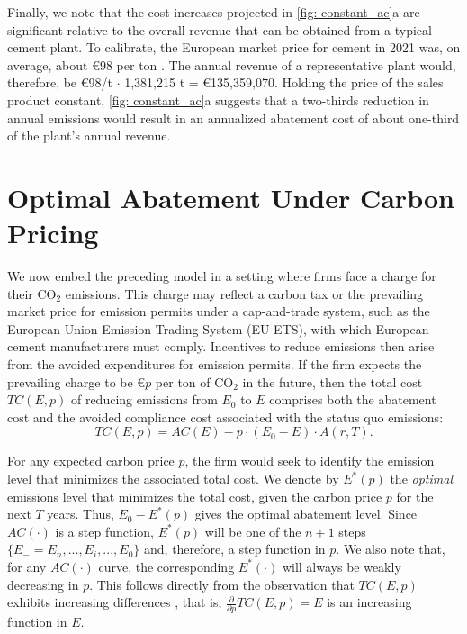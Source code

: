 \documentclass[12pt, a4paper]{article} %
\begin{document}
Finally, we note that the cost increases projected in \autoref{fig: constant_ac}a are significant relative to the overall revenue that can be obtained from a typical cement plant. To calibrate, the European market price for cement in 2021 was, on average, about \euro 98 per ton \citep{bnp2021heavy}. The annual revenue of a representative plant would, therefore, be \euro 98/t $\cdot$ 1,381,215 t = \euro 135,359,070. Holding the price of the sales product constant, \autoref{fig: constant_ac}a suggests that a two-thirds reduction in annual emissions would result in an annualized abatement cost of about one-third of the plant's annual revenue.


\section{Optimal Abatement Under Carbon Pricing}
\label{sec: results}

We now embed the preceding model in a setting where firms face a charge for their CO$_2$ emissions. This charge may reflect a carbon tax or the prevailing market price for emission permits under a cap-and-trade system, such as the European Union Emission Trading System (EU ETS), with which European cement manufacturers must comply. Incentives to reduce emissions then arise from the avoided expenditures for emission permits. If the firm expects the prevailing charge to be \euro $p$ per ton of CO$_2$ in the future, then the total cost $TC(E,p)$ of reducing emissions from $E_0$ to $E$ comprises both the abatement cost and the avoided compliance cost associated with the status quo emissions:
\begin{equation}
TC(E,p) = AC(E) - p \cdot (E_0 - E) \cdot A(r,T).
\end{equation}

For any expected carbon price $p$, the firm would seek to identify the emission level that minimizes the associated total cost. We denote by $E^*(p)$ the \emph{optimal} emissions level that minimizes the total cost, given the carbon price $p$ for the next $T$ years. Thus, $E_0 - E^*(p)$ gives the optimal abatement level. Since $AC(\cdot)$ is a step function, $E^*(p)$ will be one of the $n+1$ steps $\{E_-= E_n,..., E_i,..., E_0\}$ and, therefore, a step function in $p$. We also note that, for any $AC(\cdot)$ curve, the corresponding $E^*(\cdot)$ will always be weakly decreasing in $p$. This follows directly from the observation that $TC(E,p)$ exhibits increasing differences \citep{mas-collel1995microeconomic}, that is, $\frac{\partial}{\partial p} TC(E,p)=E$ is an increasing function in $E$.
\end{document}
